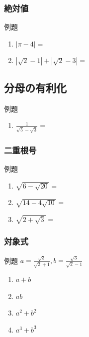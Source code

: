 \documentclass[10pt,dvipdfmx]{jsarticle}
\begin{document}
\subsubsection*{絶対値}
\begin{itembox}[l]{例題}
  \begin{large}
    \begin{enumerate}
      \item $|\pi-4|=$
      \item $|\sqrt{2}-1|+|\sqrt{2}-3|=$
    \end{enumerate}
  \end{large}
\end{itembox}
\subsection*{分母の有利化}
\begin{itembox}[l]{例題}
  \begin{large}
    \begin{enumerate}
      \item $\frac{1}{\sqrt{5}-\sqrt{3}}=$
    \end{enumerate}
  \end{large}
\end{itembox}
\subsubsection*{二重根号}
\begin{itembox}[l]{例題}
  \begin{large}
    \begin{enumerate}
      \item $\sqrt{6-\sqrt{20}}=$
      \item $\sqrt{14-4\sqrt{10}}=$
      \item $\sqrt{2+\sqrt{3}}=$
    \end{enumerate}
  \end{large}
\end{itembox}

\subsubsection*{対象式}
\begin{itembox}[l]{例題}
  $a=\frac{\sqrt{3}}{\sqrt{2}+1}, b=\frac{\sqrt{3}}{\sqrt{2}-1}$
  \begin{large}
    \begin{enumerate}
      \item $a+b$
      \item $ab$
      \item $a^2+b^2$
      \item $a^3+b^3$
    \end{enumerate}
  \end{large}
\end{itembox}
\end{document}
